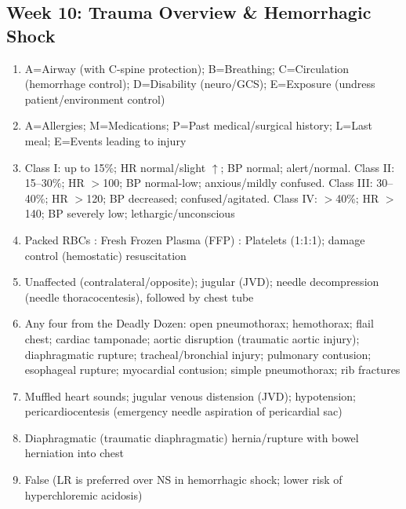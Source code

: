 \documentclass[11pt,letterpaper]{article}
\begin{document}
\begin{keybox}
\subsection*{Week 10: Trauma Overview \& Hemorrhagic Shock}
\begin{enumerate}[leftmargin=1.5em,label=\textbf{\arabic*.},start=91]
  \item A=Airway (with C-spine protection); B=Breathing; C=Circulation (hemorrhage control); D=Disability (neuro/GCS); E=Exposure (undress patient/environment control)
  \item A=Allergies; M=Medications; P=Past medical/surgical history; L=Last meal; E=Events leading to injury
  \item Class I: up to 15\%; HR normal/slight $\uparrow$; BP normal; alert/normal.
        Class II: 15--30\%; HR $>$100; BP normal-low; anxious/mildly confused.
        Class III: 30--40\%; HR $>$120; BP decreased; confused/agitated.
        Class IV: $>$40\%; HR $>$140; BP severely low; lethargic/unconscious
  \item Packed RBCs : Fresh Frozen Plasma (FFP) : Platelets (1:1:1); damage control (hemostatic) resuscitation
  \item Unaffected (contralateral/opposite); jugular (JVD); needle decompression (needle thoracocentesis), followed by chest tube
  \item Any four from the Deadly Dozen: open pneumothorax; hemothorax; flail chest; cardiac tamponade; aortic disruption (traumatic aortic injury); diaphragmatic rupture; tracheal/bronchial injury; pulmonary contusion; esophageal rupture; myocardial contusion; simple pneumothorax; rib fractures
  \item Muffled heart sounds; jugular venous distension (JVD); hypotension; pericardiocentesis (emergency needle aspiration of pericardial sac)
  \item Diaphragmatic (traumatic diaphragmatic) hernia/rupture with bowel herniation into chest
  \item False (LR is preferred over NS in hemorrhagic shock; lower risk of hyperchloremic acidosis)
\end{enumerate}

\hrulefill

\end{keybox}
\end{document}
